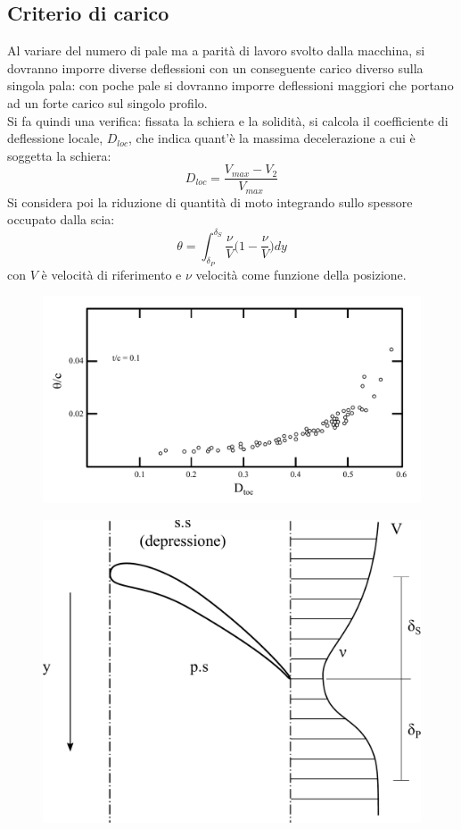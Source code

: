 \subsection{Criterio di carico}
Al variare del numero di pale ma a parità di lavoro svolto dalla macchina, si dovranno imporre diverse deflessioni con un conseguente carico diverso sulla singola pala: con poche pale si dovranno imporre deflessioni maggiori che portano ad un forte carico sul singolo profilo.\\
Si fa quindi una verifica: fissata la schiera e la solidità, si calcola il coefficiente di deflessione locale, $D_{loc}$, che indica quant'è la massima decelerazione a cui è soggetta la schiera:
\begin{equation}\label{eq:D_loc}
D_{loc} = \frac{V_{max} - V_2}{V_{max}}
\end{equation}
Si considera poi la riduzione di quantità di moto integrando sullo spessore occupato dalla scia:
\begin{equation}\label{eq:D_ridqmot}
\theta = \int_{\delta_P}^{\delta_S} \frac{\nu}{V} \bigg(1- \frac{\nu}{V} \bigg) dy
\end{equation} 
con $V$ è velocità di riferimento e $\nu$ velocità come funzione della posizione.
\begin{figure}
\centering
  \includegraphics[width=\textwidth]{fig/CritCarico1.pdf}
\caption{}
\label{fig:CritCarico1}
\end{figure}
\begin{figure}
\centering
  \includegraphics[width=.4\textwidth]{fig/CritCarico2.pdf}
\caption{}
\label{fig:CritCarico2}
\end{figure}
